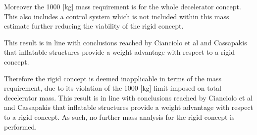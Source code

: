 Moreover the 1000 [kg] mass requirement is for the whole decelerator concept. This also includes a control system which is not included within this mass estimate further reducing the viability of the rigid concept. 

This result is in line with conclusions reached by Cianciolo et al \cite{Cianciolo2010} and Cassapakis \cite{Cassapakis1995} that inflatable structures provide a weight advantage with respect to a rigid concept.

Therefore the rigid concept is deemed inapplicable in terms of the mass requirement, due to its violation of the 1000 [kg] limit imposed on total decelerator mass. This result is in line with conclusions reached by Cianciolo et al \cite{Cianciolo2010} and Cassapakis \cite{Cassapakis1995} that inflatable structures provide a weight advantage with respect to a rigid concept. As such, no further mass analysis for the rigid concept is performed.


 


